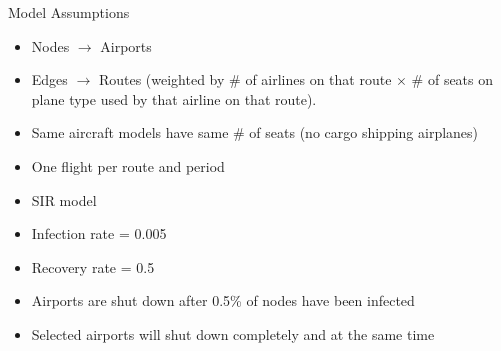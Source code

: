 \documentclass[10pt]{beamer}
\begin{document}
\begin{frame}{Model Assumptions}
    \begin{itemize}
        \item Nodes $\rightarrow$ Airports  \\
        \item Edges $\rightarrow$ Routes (weighted by \# of airlines on that route $\times$ \# of seats on plane type used by that airline on that route).\\
        \item Same aircraft models have same \# of seats (no cargo shipping airplanes)\\
        \item One flight per route and period\\
        \item SIR model
        \item Infection rate = 0.005\\
        \item Recovery rate = 0.5 \\
        \item Airports are shut down after 0.5\% of nodes have been infected
        \item Selected airports will shut down completely and at the same time
    \end{itemize}
\end{frame}
\end{document}
